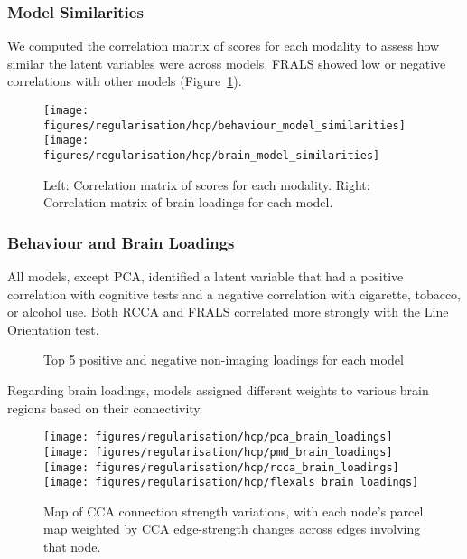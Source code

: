 \subsubsection{Model Similarities}
We computed the correlation matrix of scores for each modality to assess how similar the latent variables were across models. FRALS showed low or negative correlations with other models (Figure~\ref{fig:similarities}).

\begin{figure}[h]
\centering
\texttt{[image: figures/regularisation/hcp/behaviour\_model\_similarities]}
\texttt{[image: figures/regularisation/hcp/brain\_model\_similarities]}
\caption{Left: Correlation matrix of scores for each modality. Right: Correlation matrix of brain loadings for each model.}
\label{fig:similarities}
\end{figure}

\subsubsection{Behaviour and Brain Loadings}
All models, except PCA, identified a latent variable that had a positive correlation with cognitive tests and a negative correlation with cigarette, tobacco, or alcohol use. Both RCCA and FRALS correlated more strongly with the Line Orientation test.

\begin{figure}[h]
\centering

\caption*{Top 5 positive and negative non-imaging loadings for each model}
\label{fig:behaviour}
\end{figure}

Regarding brain loadings, models assigned different weights to various brain regions based on their connectivity.

\begin{figure}[h]
\centering
\texttt{[image: figures/regularisation/hcp/pca\_brain\_loadings]}
\texttt{[image: figures/regularisation/hcp/pmd\_brain\_loadings]}
\texttt{[image: figures/regularisation/hcp/rcca\_brain\_loadings]}
\texttt{[image: figures/regularisation/hcp/flexals\_brain\_loadings]}
\caption*{Map of CCA connection strength variations, with each node’s parcel map weighted by CCA edge-strength changes across edges involving that node.}
\label{fig:brain}
\end{figure}

